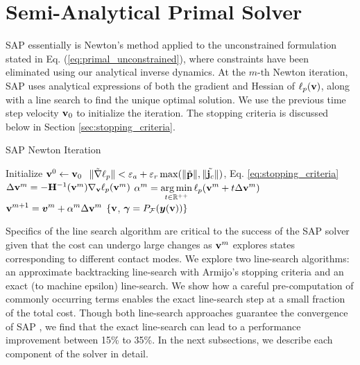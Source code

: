

\section{Semi-Analytical Primal Solver}
\label{sec:sap_solver}

SAP essentially is Newton's method
applied to the unconstrained formulation stated in
Eq. (\ref{eq:primal_unconstrained}), where constraints have been eliminated
using our analytical inverse dynamics. At the $m\text{-th}$ Newton iteration,
SAP uses analytical expressions of both the gradient and Hessian of
$\ell_p({\mathbf{v}})$, along with a line search to find the unique optimal solution.
We use the previous time step velocity ${\mathbf{v}}_0$ to initialize the
iteration. The stopping criteria is discussed below in Section
\ref{sec:stopping_criteria}.

\begin{algorithm}[H]
	\caption{SAP Newton Iteration}	
	\label{alg:sap}
	\begin{algorithmic}[1]
		\State Initialize ${\mathbf{v}}^0 \gets {\mathbf{v}}_0$
		\RepeatUntil $~\Vert\tilde{\nabla}\ell_p\Vert < \varepsilon_a + \varepsilon_r\max(\Vert\tilde{{\mathbf{p}}}\Vert,\Vert\tilde{{\mathbf{j}}_c}\Vert)$, Eq. \eqref{eq:stopping_criteria}
			\State $\Delta{\mathbf{v}}^{m} = -{\mathbf{H}}^{-1}({\mathbf{v}}^m)\nabla_{\mathbf{v}}\ell_p({\mathbf{v}}^m)$ \label{op:Newton_iteration}
			\State $\displaystyle \alpha^m = \operatorname*{arg\,min}_{t\in\mathbb{R}^{++}} \ell_p({\mathbf{v}}^m + t \Delta{\mathbf{v}}^{m})$
			\State $\displaystyle {\mathbf{v}}^{m+1} = {\bm{v}}^m + \alpha^{m}\Delta{\mathbf{v}}^{m}$
		\EndRepeatUntil
		\State\Return $\{{\mathbf{v}}$, ${\bm\gamma}=P_\mathcal{F}({\bm{y}}({\mathbf{v}}))\}$
	\end{algorithmic}
\end{algorithm}

Specifics of the line search algorithm are critical to the success of the SAP
solver given that the cost can undergo large changes as ${\mathbf{v}}^m$ explores
states corresponding to different contact modes. We explore two line-search
algorithms: an approximate backtracking line-search with Armijo's stopping
criteria and an exact (to machine epsilon) line-search. We show how a careful
pre-computation of commonly occurring terms enables the exact line-search step
at a small fraction of the total cost. Though both line-search approaches
guarantee the convergence of SAP , we find
that the exact line-search can lead to a performance improvement between 15\% to
35\%. In the next subsections, we describe each component of the solver in
detail.

